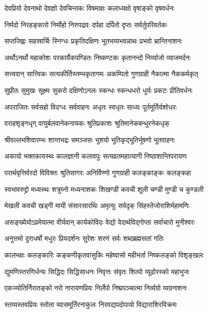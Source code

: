 \twolineshloka
{देवप्रियो देवनाथो देवज्ञो देवचिन्तकः}
{विषमाक्षः कलाध्यक्षो वृषाङ्को वृषवर्धनः}

\twolineshloka
{निर्मदो निरहङ्कारो निर्मोहो निरुपद्रवः}
{दर्पहा दर्पितो दृप्तः सर्वर्तुपरिवर्तकः}

\twolineshloka
{सप्तजिह्वः सहस्रार्चिः स्निग्धः प्रकृतिदक्षिणः}
{भूतभव्यभवन्नाथः प्रभवो भ्रान्तिनाशनः}

\twolineshloka
{अर्थोऽनर्थो महाकोशः परकार्यैकपण्डितः}
{निष्कण्टकः कृतानन्दो निर्व्याजो व्याजमर्दनः}

\twolineshloka
{सत्त्ववान् सात्त्विकः सत्यकीर्तिस्तम्भकृतागमः}
{अकम्पितो गुणग्राही नैकात्मा नैककर्मकृत्}

\twolineshloka
{सुप्रीतः सुमुखः सूक्ष्मः सुकरो दक्षिणोऽनलः}
{स्कन्धः स्कन्धधरो धुर्यः प्रकटः प्रीतिवर्धनः}

\twolineshloka
{अपराजितः सर्वसहो विदग्धः सर्ववाहनः}
{अधृतः स्वधृतः साध्यः पूर्तमूर्तिर्यशोधरः}

\twolineshloka
{वराहशृङ्गधृग् वायुर्बलवानेकनायकः}
{श्रुतिप्रकाशः श्रुतिमानेकबन्धुरनेकधृक्}

\twolineshloka
{श्रीवल्लभशिवारम्भः शान्तभद्रः समञ्जसः}
{भूशयो भूतिकृद्भूतिर्भूषणो भूतवाहनः}

\twolineshloka
{अकायो भक्तकायस्थः कालज्ञानी कलावपुः}
{सत्यव्रतमहात्यागी निष्ठाशान्तिपरायणः}

\twolineshloka
{परार्थवृत्तिर्वरदो विविक्तः श्रुतिसागरः}
{अनिर्विण्णो गुणग्राही कलङ्काङ्कः कलङ्कहा}

\twolineshloka
{स्वभावरुद्द्रो मध्यस्थः शत्रुघ्नो मध्यनाशकः}
{शिखण्डी कवची शूली चण्डी मुण्डी च कुण्डली}

\twolineshloka
{मेखली कवची खड्गी मायी संसारसारथिः}
{अमृत्युः सर्वदृक् सिंहस्तेजोराशिर्महामणिः}

\twolineshloka
{असङ्ख्येयोऽप्रमेयात्मा वीर्यवान् कार्यकोविदः}
{वेद्यो वेदार्थविद्गोप्ता सर्वाचारो मुनीश्वरः}

\twolineshloka
{अनुत्तमो दुराधर्षो मधुरः प्रियदर्शनः}
{सुरेशः शरणं सर्वः शब्दब्रह्मसतां गतिः}

\twolineshloka
{कालभक्षः कलङ्कारिः कङ्कणीकृतवासुकिः}
{महेष्वासो महीभर्ता निष्कलङ्को विशृङ्खलः}

\twolineshloka
{द्युमणिस्तरणिर्धन्यः सिद्धिदः सिद्धिसाधनः}
{निवृत्तः संवृतः शिल्पो व्यूढोरस्को महाभुजः}

\twolineshloka
{एकज्योतिर्निरातङ्को नरो नारायणप्रियः}
{निर्लेपो निष्प्रपञ्चात्मा निर्व्यग्रो व्यग्रनाशनः}

\twolineshloka
{स्तव्यस्तवप्रियः स्तोता व्यासमूर्तिरनाकुलः}
{निरवद्यपदोपायो विद्याराशिरविक्रमः}

